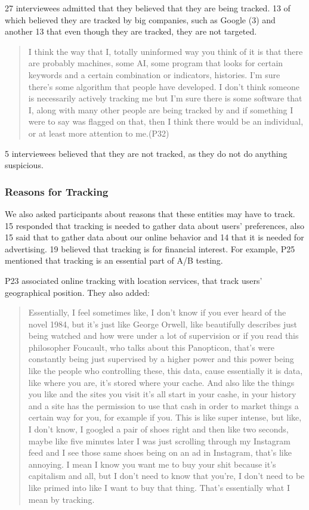 27 interviewees admitted that they believed that they are being tracked. 13 of which believed they are tracked by big companies, such as Google (3) and another 13 that even though they are tracked, they are not targeted. 


\begin{quote}I think the way that I, totally uninformed way you think of it is that there are probably machines, some AI, some program that looks for certain keywords and a certain combination or indicators, histories. I'm sure there's some algorithm that people have developed. I don't think someone is necessarily actively tracking me but I'm sure there is some software that I, along with many other people are being tracked by and if something I were to say was flagged on that, then I think there would be an individual, or at least more attention to me.(P32)\end{quote}


5 interviewees believed that they are not tracked, as they do not do anything suspicious.

\subsubsection{Reasons for Tracking}    

We also asked participants about reasons that these entities may have to track. 15 responded that tracking is needed to gather data about users' preferences, also 15 said that to gather data about our online behavior and 14 that it is needed for advertising. 19 believed that tracking is for financial interest. For example, P25 mentioned that tracking is an essential part of A/B testing. 

P23 associated online tracking with location services, that track users' geographical position. They also added:

\begin{quote} 
Essentially, I feel sometimes like, I don't know if you ever heard of the novel 1984, but it's just like George Orwell, like beautifully describes just being watched and how were under a lot of supervision or if you read this philosopher Foucault, who talks about this Panopticon, that's were constantly being just supervised by a higher power and this power being like the people who controlling these, this data, cause essentially it is data, like where you are, it's stored where your cache. And also like the things you like and the sites you visit it's all start in your cashe, in your history and a site has the permission to use that cash in order to market things a certain way for you, for example if you. This is like super intense, but like, I don't know, I googled a pair of shoes right and then like two seconds, maybe like five minutes later I was just scrolling through my Instagram feed and I see those same shoes being on an ad in Instagram, that's like annoying. I mean I know you want me to buy your shit because it's capitalism and all, but I don't need to know that you're, I don't need to be like primed into like I want to buy that thing. That's essentially what I mean by tracking.\end{quote}

